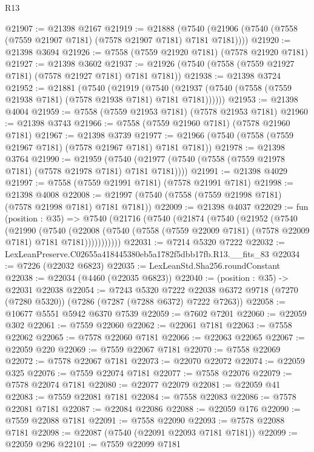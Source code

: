 \begin{lexlean}{R13}
\begin{coremodule}
@21907 := @21398 @2167
@21919 := @21888
    (@7540 (@21906 (@7540 (@7558 (@7559 @21907 @7181) (@7578 @21907 @7181) @7181 @7181))))
@21920 := @21398 @3694
@21926 := @7558 (@7559 @21920 @7181) (@7578 @21920 @7181)
@21927 := @21398 @3602
@21937 := @21926 (@7540 (@7558 (@7559 @21927 @7181) (@7578 @21927 @7181) @7181 @7181))
@21938 := @21398 @3724
@21952 := @21881
    (@7540
      (@21919
        (@7540 (@21937 (@7540 (@7558 (@7559 @21938 @7181) (@7578 @21938 @7181) @7181 @7181))))))
@21953 := @21398 @4004
@21959 := @7558 (@7559 @21953 @7181) (@7578 @21953 @7181)
@21960 := @21398 @3743
@21966 := @7558 (@7559 @21960 @7181) (@7578 @21960 @7181)
@21967 := @21398 @3739
@21977 := @21966 (@7540 (@7558 (@7559 @21967 @7181) (@7578 @21967 @7181) @7181 @7181))
@21978 := @21398 @3764
@21990 := @21959
    (@7540 (@21977 (@7540 (@7558 (@7559 @21978 @7181) (@7578 @21978 @7181) @7181 @7181))))
@21991 := @21398 @4029
@21997 := @7558 (@7559 @21991 @7181) (@7578 @21991 @7181)
@21998 := @21398 @4008
@22008 := @21997 (@7540 (@7558 (@7559 @21998 @7181) (@7578 @21998 @7181) @7181 @7181))
@22009 := @21398 @4037
@22029 := fun (position : @35) =>
  @7540
    (@21716
      (@7540
        (@21874
          (@7540
            (@21952
              (@7540
                (@21990
                  (@7540
                    (@22008
                      (@7540 (@7558 (@7559 @22009 @7181) (@7578 @22009 @7181) @7181 @7181)))))))))))
@22031 := @7214 @5320 @7222
@22032 := LexLeanPreserve.C02655a418445380eb5a1782f5dbb17fb.R13.__fits_83
@22034 := @7226 (@22032 @6823)
@22035 := LexLeanStd.Sha256.roundConstant
@22038 := @22034 (@4460 (@22035 @6823))
@22040 := (position : @35) -> @22031 @22038
@22054 := @7243
    @5320
    @7222
    @22038
    @6372
    @9718
    (@7270 (@7280 @5320))
    (@7286 (@7287 (@7288 @6372) @7222 @7263))
@22058 := @10677 @5551 @5942 @6370 @7539
@22059 := @7602 @7201
@22060 := @22059 @302
@22061 := @7559 @22060
@22062 := @22061 @7181
@22063 := @7558 @22062
@22065 := @7578 @22060 @7181
@22066 := @22063 @22065
@22067 := @22059 @220
@22069 := @7559 @22067 @7181
@22070 := @7558 @22069
@22072 := @7578 @22067 @7181
@22073 := @22070 @22072
@22074 := @22059 @325
@22076 := @7559 @22074 @7181
@22077 := @7558 @22076
@22079 := @7578 @22074 @7181
@22080 := @22077 @22079
@22081 := @22059 @41
@22083 := @7559 @22081 @7181
@22084 := @7558 @22083
@22086 := @7578 @22081 @7181
@22087 := @22084 @22086
@22088 := @22059 @176
@22090 := @7559 @22088 @7181
@22091 := @7558 @22090
@22093 := @7578 @22088 @7181
@22098 := @22087 (@7540 (@22091 @22093 @7181 @7181))
@22099 := @22059 @296
@22101 := @7559 @22099 @7181

\end{coremodule}
\end{lexlean}
